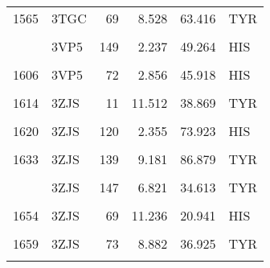 \begin{table}
\begin{tabular}{llrrrl}
			1565 & 3TGC & 69 & 8.528 & 63.416 & TYR\\
			\cellcolor{gray!6}{1575} & \cellcolor{gray!6}{3VP5} & \cellcolor{gray!6}{108} & \cellcolor{gray!6}{7.320} & \cellcolor{gray!6}{84.173} & \cellcolor{gray!6}{TYR}\\
			\addlinespace
			1597 & 3VP5 & 149 & 2.237 & 49.264 & HIS\\
			\cellcolor{gray!6}{1601} & \cellcolor{gray!6}{3VP5} & \cellcolor{gray!6}{169} & \cellcolor{gray!6}{7.299} & \cellcolor{gray!6}{73.135} & \cellcolor{gray!6}{TYR}\\
			1606 & 3VP5 & 72 & 2.856 & 45.918 & HIS\\
			\cellcolor{gray!6}{1610} & \cellcolor{gray!6}{3VP5} & \cellcolor{gray!6}{91} & \cellcolor{gray!6}{2.713} & \cellcolor{gray!6}{32.406} & \cellcolor{gray!6}{TYR}\\
			1614 & 3ZJS & 11 & 11.512 & 38.869 & TYR\\
			\addlinespace
			\cellcolor{gray!6}{1615} & \cellcolor{gray!6}{3ZJS} & \cellcolor{gray!6}{112} & \cellcolor{gray!6}{6.683} & \cellcolor{gray!6}{68.690} & \cellcolor{gray!6}{TYR}\\
			1620 & 3ZJS & 120 & 2.355 & 73.923 & HIS\\
			\cellcolor{gray!6}{1621} & \cellcolor{gray!6}{3ZJS} & \cellcolor{gray!6}{121} & \cellcolor{gray!6}{8.548} & \cellcolor{gray!6}{74.154} & \cellcolor{gray!6}{HIS}\\
			1633 & 3ZJS & 139 & 9.181 & 86.879 & TYR\\
			\cellcolor{gray!6}{1635} & \cellcolor{gray!6}{3ZJS} & \cellcolor{gray!6}{141} & \cellcolor{gray!6}{4.273} & \cellcolor{gray!6}{73.885} & \cellcolor{gray!6}{TYR}\\
			\addlinespace
			1641 & 3ZJS & 147 & 6.821 & 34.613 & TYR\\
			\cellcolor{gray!6}{1652} & \cellcolor{gray!6}{3ZJS} & \cellcolor{gray!6}{61} & \cellcolor{gray!6}{7.100} & \cellcolor{gray!6}{42.808} & \cellcolor{gray!6}{TYR}\\
			1654 & 3ZJS & 69 & 11.236 & 20.941 & HIS\\
			\cellcolor{gray!6}{1658} & \cellcolor{gray!6}{3ZJS} & \cellcolor{gray!6}{72} & \cellcolor{gray!6}{11.509} & \cellcolor{gray!6}{89.819} & \cellcolor{gray!6}{TYR}\\
			1659 & 3ZJS & 73 & 8.882 & 36.925 & TYR\\
			\addlinespace
			\cellcolor{gray!6}{1663} & \cellcolor{gray!6}{3ZJS} & \cellcolor{gray!6}{85} & \cellcolor{gray!6}{6.847} & \cellcolor{gray!6}{70.295} & \cellcolor{gray!6}{TYR}\\

\end{tabular}
\end{table}
